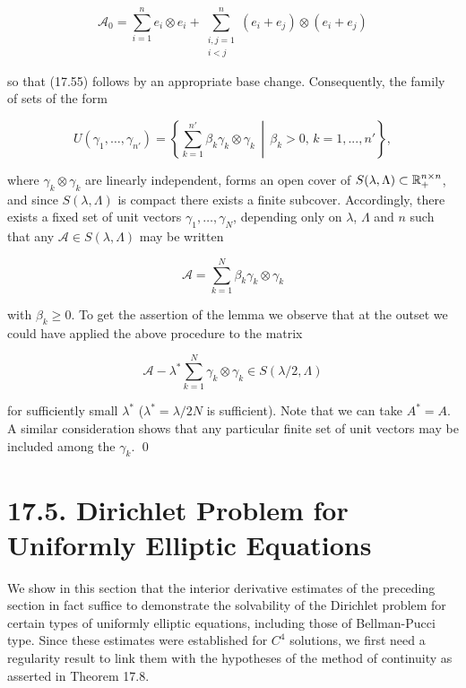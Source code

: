 \begin{equation*}
\mathscr{A}_0 = \sum_{i=1}^n e_i \otimes e_i + \sum_{\substack{i,j=1 \\ i<j}}^n (e_i + e_j) \otimes (e_i + e_j)
\end{equation*}

\noindent so that (17.55) follows by an appropriate base change. Consequently, the family of sets of the form

\begin{equation*}
U(\gamma_1, \dots, \gamma_{n'}) = \left\{ \sum_{k=1}^{n'} \beta_k \gamma_k \otimes \gamma_k \,\middle|\, \beta_k > 0,\, k = 1, . . . , n' \right\},
\end{equation*}

\noindent where $\gamma_k \otimes \gamma_k$ are linearly independent, forms an open cover of $S(\lambda, \Lambda) \subset \mathbb{R}^{n\times n}_+$, and since $S(\lambda, \Lambda)$ is compact there exists a finite subcover. Accordingly, there exists a fixed set of unit vectors $\gamma_1, \dots, \gamma_N$, depending only on $\lambda$, $\Lambda$ and $n$ such that any $\mathscr{A} \in S(\lambda, \Lambda)$ may be written

\begin{equation*}
\mathscr{A} = \sum_{k=1}^N \beta_k \gamma_k \otimes \gamma_k
\end{equation*}

\noindent with $\beta_k \ge 0$. To get the assertion of the lemma we observe that at the outset we could have applied the above procedure to the matrix

\begin{equation*}
\mathscr{A} - \lambda^{*} \sum_{k=1}^N \gamma_k \otimes \gamma_k \in S(\lambda/2, \Lambda)
\end{equation*}

\begin{flushleft}
for sufficiently small $\lambda^*$ ($\lambda^*=\lambda/2N$ is sufficient). Note that we can take $A^*=A$. A similar consideration shows that any particular finite set of unit vectors may be included among the $\gamma_k$. \qed
\end{flushleft}

\section*{17.5. Dirichlet Problem for Uniformly Elliptic Equations}

We show in this section that the interior derivative estimates of the preceding section in fact suffice to demonstrate the solvability of the Dirichlet problem for certain types of uniformly elliptic equations, including those of Bellman-Pucci type. Since these estimates were established for $C^4$ solutions, we first need a regularity result to link them with the hypotheses of the method of continuity as asserted in Theorem 17.8.

